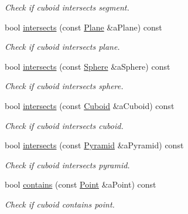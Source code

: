 \begin{DoxyCompactItemize}
\begin{DoxyCompactList}\small\item\em Check if cuboid intersects segment. \end{DoxyCompactList}\item 
bool \hyperlink{classlibrary_1_1math_1_1geom_1_1d3_1_1objects_1_1_cuboid_ac064fe1f0ef33fd5bdab5aede2e671af}{intersects} (const \hyperlink{classlibrary_1_1math_1_1geom_1_1d3_1_1objects_1_1_plane}{Plane} \&a\+Plane) const
\begin{DoxyCompactList}\small\item\em Check if cuboid intersects plane. \end{DoxyCompactList}\item 
bool \hyperlink{classlibrary_1_1math_1_1geom_1_1d3_1_1objects_1_1_cuboid_aae03606f06dfb2e7c97d3c1aed7e28d5}{intersects} (const \hyperlink{classlibrary_1_1math_1_1geom_1_1d3_1_1objects_1_1_sphere}{Sphere} \&a\+Sphere) const
\begin{DoxyCompactList}\small\item\em Check if cuboid intersects sphere. \end{DoxyCompactList}\item 
bool \hyperlink{classlibrary_1_1math_1_1geom_1_1d3_1_1objects_1_1_cuboid_a98a8c049dac309e6f07e3417803f23b4}{intersects} (const \hyperlink{classlibrary_1_1math_1_1geom_1_1d3_1_1objects_1_1_cuboid}{Cuboid} \&a\+Cuboid) const
\begin{DoxyCompactList}\small\item\em Check if cuboid intersects cuboid. \end{DoxyCompactList}\item 
bool \hyperlink{classlibrary_1_1math_1_1geom_1_1d3_1_1objects_1_1_cuboid_ae7861bd5d6f5132271cb4d76de63a5ba}{intersects} (const \hyperlink{classlibrary_1_1math_1_1geom_1_1d3_1_1objects_1_1_pyramid}{Pyramid} \&a\+Pyramid) const
\begin{DoxyCompactList}\small\item\em Check if cuboid intersects pyramid. \end{DoxyCompactList}\item 
bool \hyperlink{classlibrary_1_1math_1_1geom_1_1d3_1_1objects_1_1_cuboid_a4df75ac5e497a240dd593b32213dee52}{contains} (const \hyperlink{classlibrary_1_1math_1_1geom_1_1d3_1_1objects_1_1_point}{Point} \&a\+Point) const
\begin{DoxyCompactList}\small\item\em Check if cuboid contains point. \end{DoxyCompactList}\item 

\end{DoxyCompactItemize}
